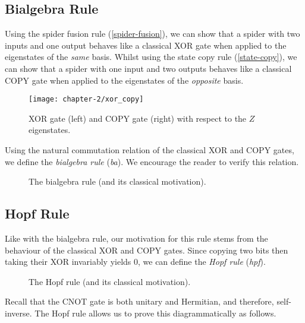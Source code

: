 
\subsection{Bialgebra Rule}

Using the spider fusion rule (\ref{spider-fusion}), we can show that a spider with two inputs and one output behaves like a classical XOR gate when applied to the eigenstates of the \textit{same} basis. Whilst using the state copy rule (\ref{state-copy}), we can show that a spider with one input and two outputs behaves like a classical COPY gate when applied to the eigenstates of the \textit{opposite} basis.

\begin{figure}[H]
    \centering
    \texttt{[image: chapter-2/xor\_copy]}
    \caption{XOR gate (left) and COPY gate (right) with respect to the $Z$ eigenstates.}
    \label{xor}
    \label{copy}
\end{figure}

Using the natural commutation relation of the classical XOR and COPY gates, we define the \textit{bialgebra rule} (\textit{ba}). We encourage the reader to verify this relation.

\begin{figure}[H]
    \centering
    \caption{The bialgebra rule (and its classical motivation).}
    \label{bialgebra}
\end{figure}


\subsection{Hopf Rule}

Like with the bialgebra rule, our motivation for this rule stems from the behaviour of the classical XOR and COPY gates. Since copying two bits then taking their XOR invariably yields 0, we can define the \textit{Hopf rule} (\textit{hpf}).

\begin{figure}[H]
    \centering
    \caption{The Hopf rule (and its classical motivation).}
    \label{hopf}
\end{figure}

Recall that the CNOT gate is both unitary and Hermitian, and therefore, self-inverse. The Hopf rule allows us to prove this diagrammatically as follows.


